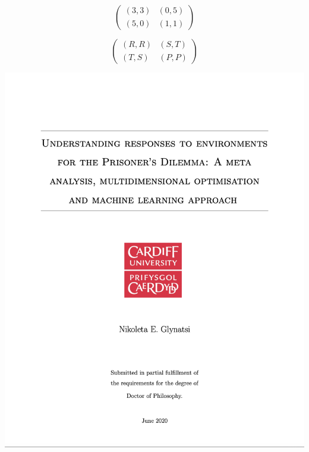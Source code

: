 \documentclass{beamer}
\begin{document}
\begin{frame}
    \begin{center}
    \LARGE{
        \begin{equation*}
            \begin{pmatrix}
                (3, 3) & (0, 5)  \\
                (5, 0) & (1, 1)
            \end{pmatrix}
        \end{equation*}}
    \end{center}
\end{frame}

\begin{frame}
    \begin{center}
    \LARGE{
        \begin{equation*}
            \begin{pmatrix}
                (R, R) & (S, T)  \\
                (T, S) & (P, P)
            \end{pmatrix}
        \end{equation*}}
    \end{center}
\end{frame}

\begin{frame}
    \centering
    
\end{frame}


\begin{frame}
    \begin{center}
    
    \end{center}
\end{frame}

\begin{frame}
    \centering
    \includegraphics[width=.75\textwidth]{static/Thesis}
\end{frame}
\end{document}
